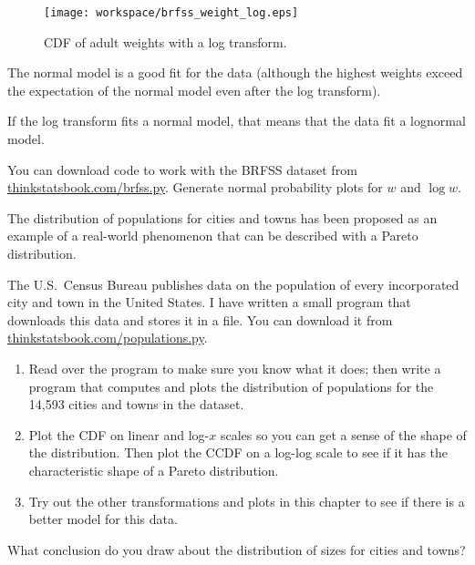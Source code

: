\documentclass[12pt]{book}
\begin{document}
\begin{figure}
\centerline{\texttt{[image: workspace/brfss\_weight\_log.eps]}}
\caption{CDF of adult weights with a log transform.}
\label{brfss_weight_log}
\end{figure}

The normal model is a good fit for the data (although the
highest weights exceed the expectation of the normal model even after
the log transform).

If the log transform fits a normal model, that means that the data
fit a lognormal model.


\begin{ex}

You can download code to work with the BRFSS dataset from
\url{thinkstatsbook.com/brfss.py}.  Generate normal probability plots
  for $w$ and $\log w$.

\end{ex}

\begin{ex}
The distribution of populations for cities and towns has been proposed
as an example of a real-world phenomenon that can be described
with a Pareto distribution.

The U.S.~Census Bureau publishes data on the population of every
incorporated city and town in the United States.  I have written a
small program that downloads this data and stores it in a file.  You
can download it from \url{thinkstatsbook.com/populations.py}.

\begin{enumerate}

\item Read over the program to make sure you know what it does; then
  write a program that computes and plots the distribution of
  populations for the 14,593 cities and towns in the dataset.

\item Plot the CDF on linear and log-$x$ scales so you can get a sense
  of the shape of the distribution.  Then plot the CCDF on a log-log
  scale to see if it has the characteristic shape of a Pareto
  distribution.

\item Try out the other transformations and plots in this chapter to
  see if there is a better model for this data.

\end{enumerate}

What conclusion do you draw about the distribution of sizes
for cities and towns?

\end{ex}
\end{document}
